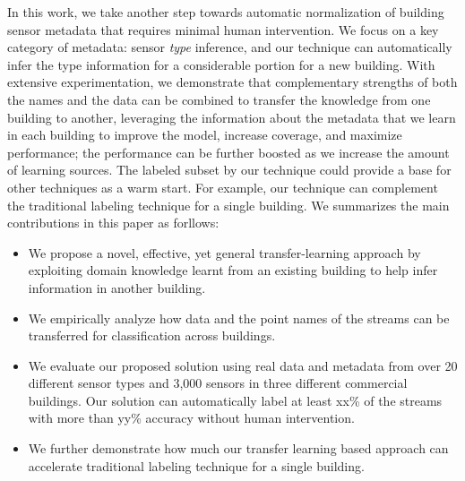 In this work, we take another step towards automatic normalization of building sensor metadata that requires minimal human intervention. 
We focus on a key category of metadata: sensor {\it type} inference, and our technique can automatically infer the type information for a considerable portion for a new building. 
With extensive experimentation, we demonstrate that complementary strengths of both the names and the data 
can be combined to transfer the knowledge from one building to another, leveraging the information 
about the metadata that we learn in each building to improve the model, increase coverage, and maximize performance; the performance can be further boosted as we increase the amount of learning sources.
The labeled subset by our technique could provide a base for other techniques as a warm start.
For example, our technique can complement the traditional labeling technique for a single building.
We summarizes the main contributions in this paper as forllows:
\begin{itemize}\itemsep1pt \parskip1pt 
\item We propose a novel, effective, yet general transfer-learning approach by exploiting domain knowledge learnt from an existing building to help infer information in another building.
\item We empirically analyze how data and the point names of the streams can be transferred for classification across buildings.
\item We evaluate our proposed solution using real data and metadata from over 20 different sensor types and 3,000 sensors in three different commercial buildings.  Our solution can automatically label at least xx\% of the streams with more than yy\% accuracy without human intervention.
\item We further demonstrate how much our transfer learning based approach can accelerate traditional labeling technique for a single building.
\end{itemize}
